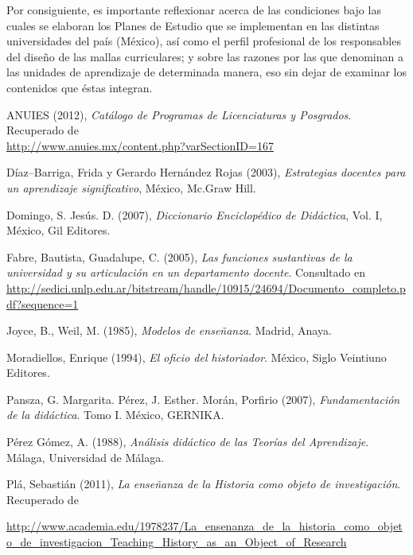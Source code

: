 Por consiguiente, es importante reflexionar acerca de las condiciones 
bajo las cuales se elaboran los Planes de Estudio que se implementan en 
las distintas universidades del país (México), así como el perfil 
profesional de los responsables del diseño de las mallas curriculares; y 
sobre las razones por las que denominan a las unidades de aprendizaje de 
determinada manera, eso sin dejar de examinar los contenidos que 
éstas integran. 
\newpage


\medskip
ANUIES (2012), \textit{Catálogo de Programas de Licenciaturas y Posgrados}. 
Recuperado de\\ \url{http://www.anuies.mx/content.php?varSectionID=167}

Díaz–Barriga, Frida y Gerardo Hernández Rojas (2003), \textit{Estrategias 
docentes para un  aprendizaje significativo}, México, Mc.Graw Hill. 

Domingo, S. Jesús. D. (2007), \textit{Diccionario Enciclopédico de Didáctica}, 
Vol. I, México, Gil Editores. 

\begin{sloppypar}
Fabre, Bautista, Guadalupe, C. (2005), \textit{Las funciones sustantivas de la 
universidad y su articulación en un departamento docente}. Consultado
en\\ 
\url{http://sedici.unlp.edu.ar/bitstream/handle/10915/24694/Documento_completo.pdf?sequence=1}
\end{sloppypar}

Joyce, B., Weil, M. (1985), \textit{Modelos de enseñanza}. Madrid, Anaya. 

Moradiellos, Enrique (1994), \textit{El oficio del historiador}. México, Siglo 
Veintiuno Editores.

Pansza, G. Margarita. Pérez, J. Esther. Morán, Porfirio (2007), 
\textit{Fundamentación de la didáctica}. Tomo I. México, GERNIKA\@.

Pérez Gómez, A. (1988), \textit{Análisis didáctico de las Teorías del 
Aprendizaje}. Málaga, Universidad de Málaga.


Plá, Sebastián (2011), \textit{La enseñanza de la Historia como objeto de 
investigación}.  Recuperado de\\ \begin{sloppypar} 
\url{http://www.academia.edu/1978237/La_ensenanza_de_la_historia_como_objeto_de_investigacion_Teaching_History_as_an_Object_of_Research}
\end{sloppypar}

